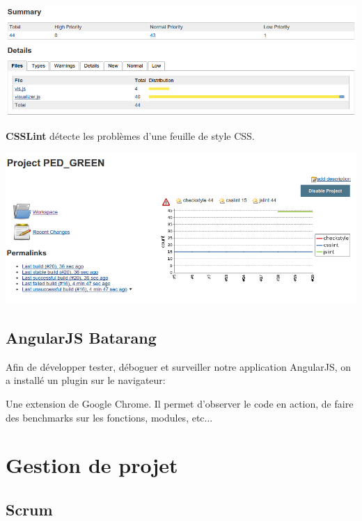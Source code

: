 \documentclass [a4paper,11pt]{article}
\begin{document}
\begin{center}
\includegraphics[scale=0.4]{img/checkstyle.png}
\end{center}

\textbf{CSSLint} détecte les problèmes d'une feuille de style CSS.

\begin{center}
\includegraphics[scale=0.4]{img/jslint.png}
\end{center}

\subsection{AngularJS Batarang}

Afin de développer tester, déboguer et surveiller notre application AngularJS, on a installé un plugin sur le navigateur:\newline

Une extension de Google Chrome. Il permet d'observer le code en action, de faire des benchmarks sur les fonctions, modules, etc...

\newpage
\section{Gestion de projet}

\subsection{Scrum}
\end{document}
